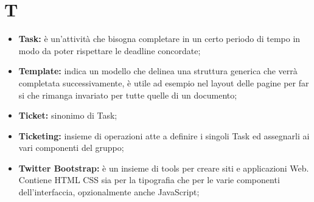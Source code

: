 \section*{T} %
\label{sec:t}
	\begin{itemize}
		\item \textbf{Task:} è un'attività che bisogna completare in un certo periodo di tempo in modo da poter rispettare le deadline concordate;
		\item \textbf{Template:} indica un modello che delinea una struttura generica che verrà completata successivamente, è utile ad esempio nel layout delle pagine per far si che rimanga invariato per tutte quelle di un documento;
		\item \textbf{Ticket:} sinonimo di Task;
		\item \textbf{Ticketing:} insieme di operazioni atte a definire i singoli Task ed assegnarli ai vari componenti del gruppo; 		
		\item \textbf{Twitter Bootstrap:} è un insieme di tools per creare siti e applicazioni Web. Contiene HTML CSS sia per la tipografia che per le varie componenti dell'interfaccia, opzionalmente anche JavaScript;
		
	\end{itemize}
\pagebreak
